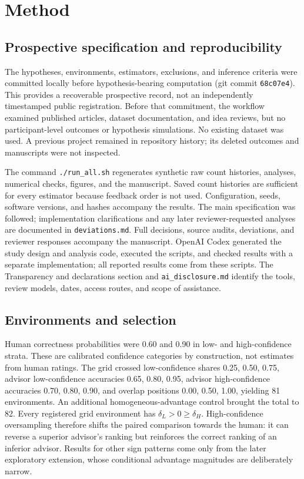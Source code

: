 \documentclass[
  british,
  11pt,
]{article}
\begin{document}
\section{Method}\label{method}

\subsection{Prospective specification and
reproducibility}\label{prospective-specification-and-reproducibility}

The hypotheses, environments, estimators, exclusions, and inference
criteria were committed locally before hypothesis-bearing computation
(git commit \texttt{68c07e4}). This provides a recoverable prospective
record, not an independently timestamped public registration. Before
that commitment, the workflow examined published articles, dataset
documentation, and idea reviews, but no participant-level outcomes or
hypothesis simulations. No existing dataset was used. A previous project
remained in repository history; its deleted outcomes and manuscripts
were not inspected.

The command \texttt{./run\_all.sh} regenerates synthetic raw count
histories, analyses, numerical checks, figures, and the manuscript.
Saved count histories are sufficient for every estimator because
feedback order is not used. Configuration, seeds, software versions, and
hashes accompany the results. The main specification was followed;
implementation clarifications and any later reviewer-requested analyses
are documented in \texttt{deviations.md}. Full decisions, source audits,
deviations, and reviewer responses accompany the manuscript. OpenAI
Codex generated the study design and analysis code, executed the
scripts, and checked results with a separate implementation; all
reported results come from these scripts. The Transparency and
declarations section and \texttt{ai\_disclosure.md} identify the tools,
review models, dates, access routes, and scope of assistance.

\subsection{Environments and
selection}\label{environments-and-selection}

Human correctness probabilities were 0.60 and 0.90 in low- and
high-confidence strata. These are calibrated confidence categories by
construction, not estimates from human ratings. The grid crossed
low-confidence shares 0.25, 0.50, 0.75, advisor low-confidence
accuracies 0.65, 0.80, 0.95, advisor high-confidence accuracies 0.70,
0.80, 0.90, and overlap positions 0.00, 0.50, 1.00, yielding 81
environments. An additional homogeneous-advantage control brought the
total to 82. Every registered grid environment has
\(\delta_L>0\ge\delta_H\). High-confidence oversampling therefore shifts
the paired comparison towards the human: it can reverse a superior
advisor's ranking but reinforces the correct ranking of an inferior
advisor. Results for other sign patterns come only from the later
exploratory extension, whose conditional advantage magnitudes are
deliberately narrow.
\end{document}
